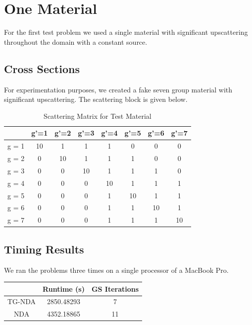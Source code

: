 \section{One Material}
For the first test problem we used a single material with significant upscattering throughout the domain with a constant source. 
\subsection{Cross Sections}
For experimentation purposes, we created a fake seven group material with significant upscattering. The scattering block is given below.
\begin{table}
\begin{center}
    \begin{tabular}{|c|c|c|c|c|c|c|c|}
    \hline
    & g'=1 & g'=2 & g'=3 & g'=4 & g'=5 & g'=6 & g'=7  \\
    \hline    
    g = 1 & 10 & 1 & 1 & 1 & 0 & 0 & 0  \\
    \hline    
    g = 2 & 0 & 10 & 1 & 1 & 1 & 0 & 0  \\
    \hline    
    g = 3 & 0 & 0 & 10 & 1 & 1 & 1 & 0  \\
    \hline    
    g = 4 & 0 & 0 & 0 & 10 & 1 & 1 & 1  \\
    \hline    
    g = 5 & 0 & 0 & 0 & 1 & 10 & 1 & 1  \\
    \hline    
    g = 6 & 0 & 0 & 0 & 1 & 1 & 10 & 1  \\
    \hline    
    g = 7 & 0 & 0 & 0 & 1 & 1 & 1 & 10  \\
    \hline
    \end{tabular}
\end{center}
\caption{Scattering Matrix for Test Material}
\end{table}
\subsection{Timing Results}
We ran the problems three times on a single processor of a MacBook Pro. 
\begin{center}
    \begin{tabular}{|c|c|c|}
    \hline
    & Runtime (s) & GS Iterations \\
    \hline
    TG-NDA & 2850.48293 & 7 \\
    NDA & 4352.18865 & 11 \\
    \hline
    \end{tabular}
\end{center}
